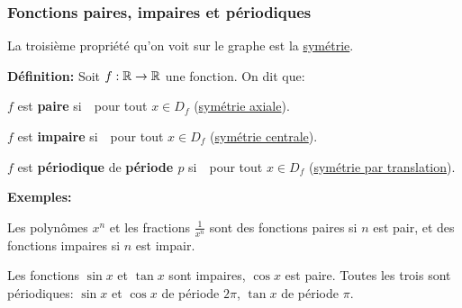 \begin{frame}
\frametitle{\bf Fonctions paires, impaires et p\'eriodiques}
\medskip 

{\small 
La troisi\`eme propri\'et\'e qu'on voit sur le graphe est la 
\underline{sym\'etrie}.}
\vspace*{2mm}

{\bf D\'efinition:} 
Soit $f:\mathbb R\rightarrow\mathbb R$ une fonction. On dit que: 
\vspace*{1mm}

\begin{itemize}
\bitem
\parbox[t]{6cm}{
$f$ est {\bf paire} si\ \ pour tout 
$x\!\in\! D_f$ (\underline{sym\'etrie axiale}).}
\quad
\raisebox{-.8\height}{\pair}
\vspace*{1mm}

\bitem
\parbox[t]{6cm}{
$f$ est {\bf impaire} si\ \ pour tout 
$x\!\in\! D_f$ (\underline{sym\'etrie centrale}).}
\quad
\raisebox{-.8\height}{\impair} 
\vspace*{1mm}

\bitem
\parbox[t]{5.5cm}{
$f$ est {\bf p\'eriodique} de {\bf p\'eriode $p$} si\ 
\ pour tout $x\!\in\! D_f$
(\underline{sym\'etrie par translation}).}
\quad
\raisebox{-.8\height}{\periodique} 
\end{itemize} 
\vspace*{0.5mm}

\pause
{\small 
{\bf Exemples:}
\begin{itemize}
\parbox{10cm}{
\bitem
Les polyn\^omes $x^n$ et les fractions $\frac{1}{x^n}$ sont des fonctions 
paires si $n$ est pair, et des fonctions impaires si $n$ est impair.}  
\parbox{10cm}{
\bitem
Les fonctions $\sin x$ et $\tan x$ sont impaires, $\cos x$ est paire. 
Toutes les trois sont p\'eriodiques: $\sin x$ et $\cos x$ de p\'eriode $2\pi$, 
$\tan x$ de p\'eriode $\pi$.}
\end{itemize} 

}

\end{frame}


